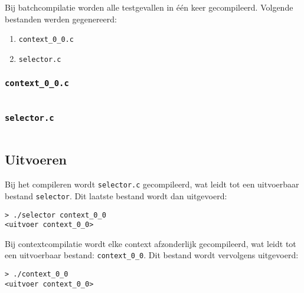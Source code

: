 Bij batchcompilatie worden alle testgevallen in één keer gecompileerd.
Volgende bestanden werden gegenereerd:

\begin{enumerate}
    \item \texttt{context\_0\_0.c}
    \item \texttt{selector.c}
\end{enumerate}

\subsubsection{\texttt{context\_0\_0.c}}

\inputminted{c}{sources/echo-function/context_0_0.c}

\subsubsection{\texttt{selector.c}}

\inputminted{c}{sources/echo-function/selector.c}

\subsection{Uitvoeren}\label{subsec:echo-function-c-uitvoeren}

Bij het compileren wordt \texttt{selector.c} gecompileerd, wat leidt tot een uitvoerbaar bestand \texttt{selector}.
Dit laatste bestand wordt dan uitgevoerd:

\begin{verbatim}
> ./selector context_0_0
<uitvoer context_0_0>
\end{verbatim}


Bij contextcompilatie wordt elke context afzonderlijk gecompileerd, wat leidt tot een uitvoerbaar bestand: \texttt{context\_0\_0}.
Dit bestand wordt vervolgens uitgevoerd:

\begin{verbatim}
> ./context_0_0
<uitvoer context_0_0>
\end{verbatim}
